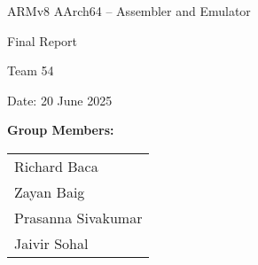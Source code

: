 \documentclass[11pt]{article}
\begin{document}
\begin{titlepage}
    \centering
    \vspace*{2cm}
    
    {\huge ARMv8 AArch64 – Assembler and Emulator\par}
    
    \vspace{1.5cm}
    
    {\LARGE Final Report\par}
    
    \vspace{0.5cm}
    
    
    \vfill %
    
    {\Large Team 54\par}
    
    \vspace{1cm}
    
    {\large Date: 20 June 2025\par}
    
    \vspace{1cm}
    
    \textbf{Group Members:}\\
    \begin{large}
        \begin{tabular}{l}
            Richard Baca\\
            Zayan Baig\\
            Prasanna Sivakumar\\
            Jaivir Sohal\\
        \end{tabular}
    \end{large}

    \vspace*{2cm}
    
\end{titlepage}

\tableofcontents
\newpage

\end{document}
